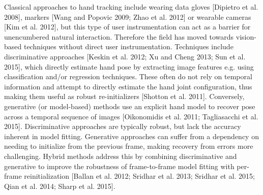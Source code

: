 \begin{DRAFT}
Classical approaches to hand tracking include wearing data gloves [Dipietro et al. 2008], markers [Wang and Popovic 2009; Zhao et al. 2012] or wearable cameras [Kim et al. 2012], but this type of user instrumentation can act as a barrier for unencumbered natural interaction. Therefore the field has moved towards vision-based techniques without direct user instrumentation. Techniques include discriminative approaches [Keskin et al. 2012; Xu and Cheng 2013; Sun et al. 2015], which directly estimate hand pose by extracting image features e.g. using classification and/or regression techniques. These often do not rely on temporal information and attempt to directly estimate the hand joint configuration, thus making them useful as robust re-initializers [Shotton et al. 2011]. Conversely, generative (or model-based) methods use an explicit hand model to recover pose across a temporal sequence of images [Oikonomidis et al. 2011; Tagliasacchi et al. 2015]. Discriminative approaches are typically robust, but lack the accuracy inherent in model fitting. Generative approaches can suffer from a dependency on needing to initialize from the previous frame, making recovery from errors more challenging. Hybrid methods address this by combining discriminative and generative to improve the robustness of frame-to-frame model fitting with per-frame reinitialization [Ballan et al. 2012; Sridhar et al. 2013; Sridhar et al. 2015; Qian et al. 2014; Sharp et al. 2015].


\end{DRAFT}
